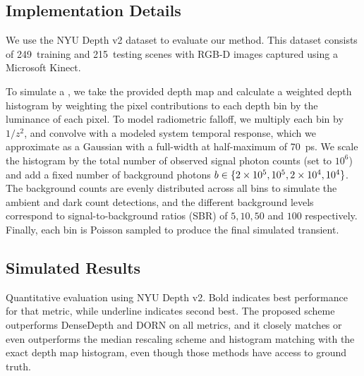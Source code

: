 


\subsection{Implementation Details}

We use the NYU Depth v2 dataset to evaluate our method. This dataset consists of
249~training and 215~testing scenes with RGB-D images captured using a Microsoft
Kinect.

To simulate a , we take the provided depth map and 
calculate a weighted depth histogram by weighting the pixel contributions to
each depth bin by the luminance of each pixel. To model radiometric falloff, we
multiply each bin by $1/z^2$, and convolve with a modeled system temporal
response, which we approximate as a Gaussian with a full-width at half-maximum of 70~ps. We scale
the histogram by the total number of observed signal photon counts (set to 
$10^6$) and  add a fixed number of background photons $b \in \{2\times 10^5, 10^5, 2\times
10^4, 10^4\}$. The background counts are evenly distributed across all bins to simulate the ambient and dark
count detections, and the different background levels correspond to
signal-to-background ratios (SBR) of $5, 10, 50$ and $100$ respectively. Finally,
each bin is Poisson sampled to produce the final simulated transient.

\subsection{Simulated Results}
\begin{table*}[!t]
  \begin{center}
   {\fontsize{7pt}{8pt}\selectfont 
      
   } 
\caption{
  Quantitative evaluation using NYU Depth v2. Bold indicates best
performance for that metric, while underline indicates second best. The proposed
scheme outperforms DenseDepth and DORN on all metrics, and it closely matches or
even outperforms the median rescaling scheme and histogram matching with the
exact depth map histogram, even though those methods have access to ground
truth.}
\label{tab:comparison}
\end{center}
\end{table*}

